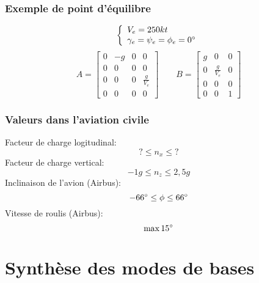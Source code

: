 \documentclass[footheight=2em]{beamer}
\begin{document}
\begin{frame}
    \frametitle{Exemple de point d'équilibre}\pause{}
    \[
    \left \{
    \begin{array}{l}
        V_e = 250 kt \\
        \gamma_e = \psi_e = \phi_e = 0 \degree
    \end{array}
    \right.
    \]
    \[
    A =
    \left[
    \begin{array}{cccc}
        0 & -g & 0 & 0 \\
        0 & 0 & 0 & 0 \\
        0 & 0 & 0 & \frac{g}{V_e} \\
        0 & 0 & 0 & 0
    \end{array}
    \right]
    \qquad
    B =
    \left[
    \begin{array}{cccc}
        g & 0 & 0 \\
        0 & \frac{g}{V_e} & 0 \\
        0 & 0 & 0 \\
        0 & 0 & 1
    \end{array}
    \right]
    \]
\end{frame}


\begin{frame}
    \frametitle{Valeurs dans l'aviation civile}\pause{}
    Facteur de charge logitudinal:
    \[
    ? \le n_x \le ?
    \]\pause{}
    Facteur de charge vertical:
    \[
    -1g \le n_z \le 2,5g
    \]\pause{}
    Inclinaison de l'avion (Airbus):
    \[
    -66\degree \le \phi \le 66\degree
    \] \pause{}
    Vitesse de roulis (Airbus):
    \[
    \max 15\degree
    \]
\end{frame}


\section{Synthèse des modes de bases}

\end{document}
